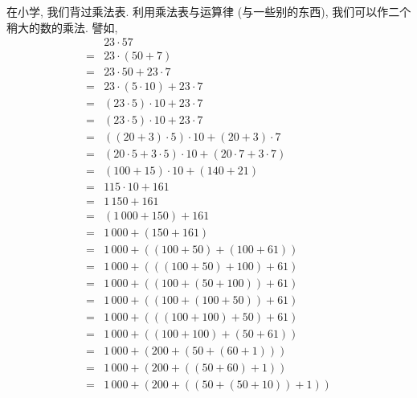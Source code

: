 \documentclass[%
    UTF8,%
    fontset=none,%
    punct=kaiming,%
    zihao=-4,%
    a4paper,%
    oneside,%
]{ctexbook}
\begin{document}
\begin{example}
    在小学, 我们背过乘法表.
    利用乘法表与运算律 (与一些别的东西),
    我们可以作二个稍大的数的乘法.
    譬如,
    \begin{align*}
             & 23 \cdot 57                                    \\
        = {} & 23 \cdot (50 + 7)                              \\
        = {} & 23 \cdot 50 + 23 \cdot 7                       \\
        = {} & 23 \cdot (5 \cdot 10) + 23 \cdot 7             \\
        = {} & (23 \cdot 5) \cdot 10 + 23 \cdot 7             \\
        = {} & (23 \cdot 5) \cdot 10 + 23 \cdot 7             \\
        = {} & ((20 + 3) \cdot 5) \cdot 10 + (20 + 3) \cdot 7 \\
        = {} & (20 \cdot 5 + 3 \cdot 5) \cdot 10
        + (20 \cdot 7 + 3 \cdot 7 )                           \\
        = {} & (100 + 15) \cdot 10
        + (140 + 21)                                          \\
        = {} & 115 \cdot 10 + 161                             \\
        = {} & 1\,150 + 161                                   \\
        = {} & (1\,000 + 150) + 161                           \\
        = {} & 1\,000 + (150 + 161)                           \\
        = {} & 1\,000 + ((100 + 50) + (100 + 61))             \\
        = {} & 1\,000 + (((100 + 50) + 100) + 61)             \\
        = {} & 1\,000 + ((100 + (50 + 100)) + 61)             \\
        = {} & 1\,000 + ((100 + (100 + 50)) + 61)             \\
        = {} & 1\,000 + (((100 + 100) + 50) + 61)             \\
        = {} & 1\,000 + ((100 + 100) + (50 + 61))             \\
        = {} & 1\,000 + (200 + (50 + (60 + 1)))               \\
        = {} & 1\,000 + (200 + ((50 + 60) + 1))               \\
        = {} & 1\,000 + (200 + ((50 + (50 + 10)) + 1))        \\

\end{align*}
\end{example}
\end{document}
